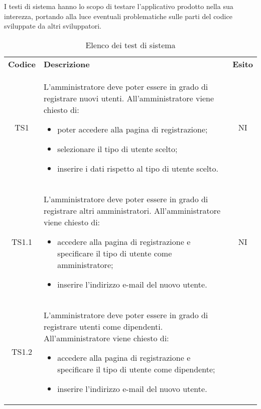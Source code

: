 I testi di sistema hanno lo scopo di testare l’applicativo prodotto nella sua interezza, portando alla luce eventuali problematiche sulle parti del codice sviluppate da altri sviluppatori.
{
    \renewcommand{\arraystretch}{1.5}
    \centering
    \begin{longtable}{ c C{11cm} c }
        \caption{Elenco dei test di sistema}\\
        \rowcolor{\primaryColor}
        \textcolor{\secondaryColor}{
        \textbf{Codice}}     & \textcolor{\secondaryColor}
        {\textbf{Descrizione}} & \textcolor{\secondaryColor}{\textbf{Esito}} \\

        TS1&
        \begin{flushleft}
            L'amministratore deve poter essere in grado di registrare nuovi utenti.
            All'amministratore viene chiesto di:
        \end{flushleft}
        
        \begin{itemize}
            \item poter accedere alla pagina di registrazione;
            \item selezionare il tipo di utente scelto;
            \item inserire i dati rispetto al tipo di utente scelto.
            
        \end{itemize}&
        NI\\

      TS1.1&
      \begin{flushleft}
            L'amministratore deve poter essere in grado di registrare altri amministratori.
            All'amministratore viene chiesto di:
      \end{flushleft}
        \begin{itemize}
            \item accedere alla pagina di registrazione e specificare il tipo di utente come amministratore;
            \item inserire l'indirizzo e-mail del nuovo utente.
            
        \end{itemize}&
        NI\\

        TS1.2&
        \begin{flushleft}
            L'amministratore deve poter essere in grado di registrare utenti come dipendenti.
            All'amministratore viene chiesto di:
        \end{flushleft}
        \begin{itemize}
            \item accedere alla pagina di registrazione e specificare il tipo di utente come dipendente;
            \item inserire l'indirizzo e-mail del nuovo utente.
            

\end{itemize}
\end{longtable}}
